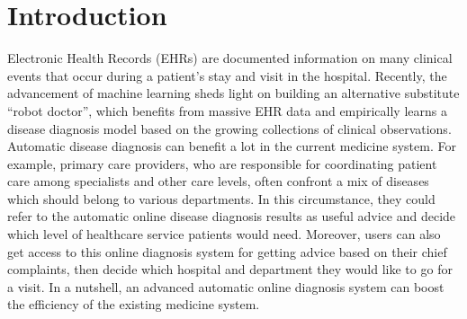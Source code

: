 \documentclass[sigconf]{acmart}
\begin{document}

\maketitle

\section{Introduction}
Electronic Health Records (EHRs) are documented information on many clinical events that occur during a patient's stay and visit in the hospital. Recently, the advancement of machine learning sheds light on building an alternative substitute ``robot doctor'', which benefits from massive EHR data and empirically learns a disease diagnosis model based on the growing collections of clinical observations. Automatic disease diagnosis can benefit a lot in the current medicine system. For example, primary care providers, who are responsible for coordinating patient care among specialists and other care levels, often confront a mix of diseases which should belong to various departments. In this circumstance, they could refer to the automatic online disease diagnosis results as useful advice and decide which level of healthcare service patients would need. Moreover, users can also get access to this online diagnosis system for getting advice based on their chief complaints, then decide which hospital and department they would like to go for a visit. In a nutshell, an advanced automatic online diagnosis system can boost the efficiency of the existing medicine system.
\end{document}
